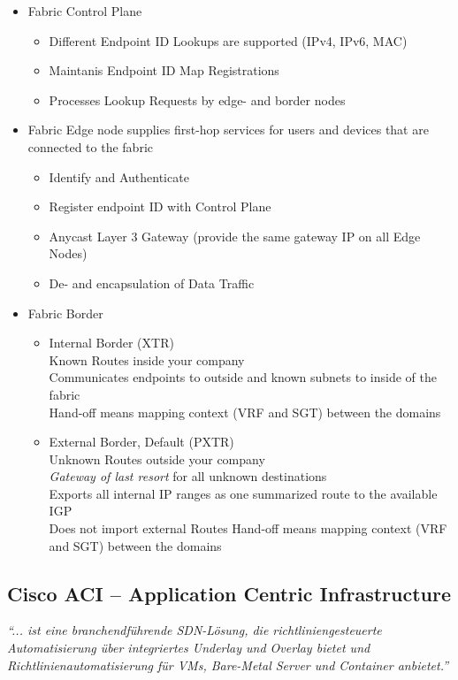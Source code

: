 \begin{itemize}
    \item Fabric Control Plane
        \begin{itemize}
            \item Different Endpoint ID Lookups are supported (IPv4, IPv6, MAC)
            \item Maintanis Endpoint ID Map Registrations
            \item Processes Lookup Requests by edge- and border nodes
        \end{itemize}
    \item Fabric Edge node supplies first-hop services for users and devices that are connected to the fabric
        \begin{itemize}
            \item Identify and Authenticate
            \item Register endpoint ID with Control Plane
            \item Anycast Layer 3 Gateway (provide the same gateway IP on all Edge Nodes)
            \item De- and encapsulation of Data Traffic 
        \end{itemize}
    \item Fabric Border
        \begin{itemize}
            \item Internal Border (XTR) \\
            Known Routes inside your company \\
            Communicates endpoints to outside and known subnets to inside of the fabric \\
            Hand-off means mapping context (VRF and SGT) between the domains
            \item External Border, Default (PXTR) \\
            Unknown Routes outside your company \\
            \emph{Gateway of last resort} for all unknown destinations \\
            Exports all internal IP ranges as one summarized route to the available IGP \\
            Does not import external Routes
            Hand-off means mapping context (VRF and SGT) between the domains
        \end{itemize}
\end{itemize}

\subsection{Cisco ACI -- Application Centric Infrastructure}
\emph{``... ist eine branchendführende SDN-Lösung, die richtliniengesteuerte Automatisierung über integriertes Underlay und Overlay bietet 
und Richtlinienautomatisierung für VMs, Bare-Metal Server und Container anbietet.''}

